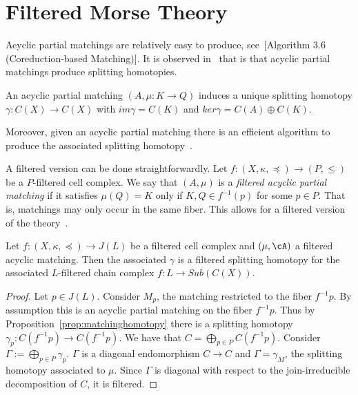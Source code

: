 


\section{Filtered Morse Theory}


Acyclic partial matchings are relatively easy to produce, see~[Algorithm 3.6 (Coreduction-based Matching)]\cite{focm}.   It is observed in~\cite{sko,focm} that is that acyclic partial matchings produce splitting homotopies.

\begin{prop}\label{prop:matchinghomotopy}
An acyclic partial matching $(A,\mu:K\to Q)$ induces a unique splitting homotopy $\gamma:C(X)\to C(X)$ with $im\gamma = C(K)$ and $ker\gamma = C(A)\oplus C(K)$.
\end{prop}

Moreover, given an acyclic partial matching there is an efficient algorithm to produce the associated splitting homotopy~\cite[Algorithm 3.12 (Gamma Algorithm)]{focm}.  



A filtered version can be done straightforwardly.   Let $f:(X,\kappa,\preceq)\to (P,\leq)$ be a $P$-filtered cell complex.  We say that $(A,\mu)$ is a {\em filtered acyclic partial matching} if it satisfies $\mu(Q)=K$ only if $K,Q\in f^{-1}(p)$ for some $p\in P$.  That is, matchings may only occur in the same fiber.  This allows for a filtered version of the theory~\cite{mn}.

\begin{prop}
Let $f:(X,\kappa,\preceq)\to J(L)$ be a filtered cell complex and $(\mu,\cA)$ a filtered acyclic matching.  Then the associated $\gamma$ is a filtered splitting homotopy for the associated $L$-filtered chain complex $f:L\to Sub(C(X))$.
\end{prop}
\begin{proof}
Let $p\in J(L)$.  Consider $M_p$, the matching restricted to the fiber $f^{-1}p$.  By assumption this is an acyclic partial matching on the fiber $f^{-1}p$.  Thus by Proposition~\ref{prop:matchinghomotopy} there is a splitting homotopy $\gamma_p:C(f^{-1}p)\to C(f^{-1}p)$.     We have that $C=\bigoplus_{p\in P} C(f^{-1}p)$.  Consider $\Gamma:= \bigoplus_{p\in P} \gamma_p$.  $\Gamma$ is a diagonal endomorphism $C\to C$ and $\Gamma=\gamma_M$, the splitting homotopy associated to $\mu$.  Since $\Gamma$ is diagonal with respect to the join-irreducible decomposition of $C$, it is filtered.

\end{proof}





